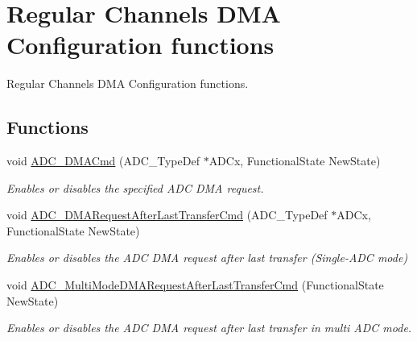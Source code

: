 \hypertarget{group___a_d_c___group5}{\section{Regular Channels D\-M\-A Configuration functions}
\label{group___a_d_c___group5}
}


Regular Channels D\-M\-A Configuration functions.  


\subsection*{Functions}
\begin{DoxyCompactItemize}
\item 
void \hyperlink{group___a_d_c___group5_gac5881d5995818001584b27b137a8dbcb}{A\-D\-C\-\_\-\-D\-M\-A\-Cmd} (A\-D\-C\-\_\-\-Type\-Def $\ast$A\-D\-Cx, Functional\-State New\-State)
\begin{DoxyCompactList}\small\item\em Enables or disables the specified A\-D\-C D\-M\-A request. \end{DoxyCompactList}\item 
void \hyperlink{group___a_d_c___group5_ga912fd3e923ae4435621724e1bbc52729}{A\-D\-C\-\_\-\-D\-M\-A\-Request\-After\-Last\-Transfer\-Cmd} (A\-D\-C\-\_\-\-Type\-Def $\ast$A\-D\-Cx, Functional\-State New\-State)
\begin{DoxyCompactList}\small\item\em Enables or disables the A\-D\-C D\-M\-A request after last transfer (Single-\/\-A\-D\-C mode) \end{DoxyCompactList}\item 
void \hyperlink{group___a_d_c___group5_ga40f2be2edf2a33fc15f4a5933b562970}{A\-D\-C\-\_\-\-Multi\-Mode\-D\-M\-A\-Request\-After\-Last\-Transfer\-Cmd} (Functional\-State New\-State)
\begin{DoxyCompactList}\small\item\em Enables or disables the A\-D\-C D\-M\-A request after last transfer in multi A\-D\-C mode. \end{DoxyCompactList}\end{DoxyCompactItemize}


